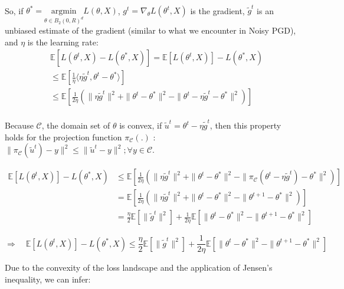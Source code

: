 \documentclass[12pt]{extarticle}
\begin{document}
\\
So, if $\theta^{*}=\underset{\theta \in B_2(0, R)^d}{\mathrm{argmin}} L(\theta, X)$, $g^t = \nabla_\theta L(\theta^t, X)$ is the gradient, $\tilde{g}^{t}$ is an unbiased estimate of the gradient (similar to what we encounter in Noisy PGD), and $\eta$ is the learning rate:\\
\begin{align*}
	&\mathbb{E}[L(\theta^t, X) -  L(\theta^{*}, X)] = \mathbb{E}[L(\theta^t, X)] -  L(\theta^{*}, X) \\
	&\le \mathbb{E}\left[\frac{1}{\eta}\langle \eta \tilde{g}^{t}, \theta^{t} - \theta^{*} \rangle\right] \\
	&\leq \mathbb{E}\left[\frac{1}{2\eta}\left(\|\eta \tilde{g}^{t}\|^2 + \|\theta^{t} - \theta^{*}\|^2 - \|\theta^{t}-\eta \tilde{g}^{t} - \theta^{*}\|^2\right)\right] \\
\end{align*}

Because $\mathcal{C}$, the domain set of $\theta$ is convex, if $\tilde{u}^{t} = \theta^{t} - \eta \tilde{g}^{t}$, then this property holds for the projection function $\pi_\mathcal{C}(.)$ : $\|\pi_\mathcal{C}(\tilde{u}^{t})-y\|^2 \le \|\tilde{u}^{t}-y\|^2  ; \forall y \in \mathcal{C}$.

\begin{align*}
	\mathbb{E}[L(\theta^t, X)] -  L(\theta^{*}, X) &\leq \mathbb{E}\left[\frac{1}{2\eta}\left(\|\eta \tilde{g}^{t}\|^2 + \|\theta^{t} - \theta^{*}\|^2 - \|\pi_\mathcal{C}(\theta^{t}-\eta \tilde{g}^{t}) - \theta^{*}\|^2\right)\right]\\
	& = \mathbb{E}\left[\frac{1}{2\eta}\left(\|\eta \tilde{g}^{t}\|^2 + \|\theta^{t} - \theta^{*}\|^2 - \|\theta^{t+1} - \theta^{*}\|^2\right)\right]\\
	& = \frac{\eta}{2}\mathbb{E}[\|\tilde{g}^{t}\|^2]+\frac{1}{2\eta}\mathbb{E} [\|\theta^{t} - \theta^{*}\|^2-\|\theta^{t+1} - \theta^{*}\|^2]
\end{align*}

\begin{equation}
	\Rightarrow\quad \mathbb{E}[L(\theta^t, X)] - L(\theta^{*}, X) \leq \frac{\eta}{2}\mathbb{E}[\|\tilde{g}^{t}\|^2] + \frac{1}{2\eta}\mathbb{E} [\|\theta^{t} - \theta^{*}\|^2 - \|\theta^{t+1} - \theta^{*}\|^2]\label{eq:Third}
\end{equation}

Due to the convexity of the loss landscape and the application of Jensen's inequality, we can infer:
\end{document}
